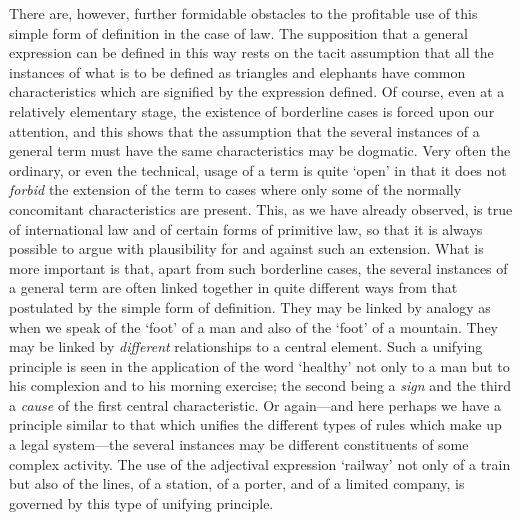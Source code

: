 \documentclass[12pt,oneside]{book}  %
\begin{document}
There are, however, further formidable obstacles to the profitable use
of this simple form of definition in the case of law. The supposition
that a general expression can be defined in this way rests on the tacit
assumption that all the instances of what is to be defined as triangles
and elephants have common characteristics which are signified by the
expression defined. Of course, even at a relatively elementary stage,
the existence of borderline cases is forced upon our attention, and this
shows that the assumption that the several instances of a general term
must have the same characteristics may be dogmatic. Very often the
ordinary, or even the technical, usage of a term is quite `open' in that
it does not \emph{forbid} the extension of the term to cases where only
some of the normally concomitant characteristics are present. This, as
we have already observed, is true of international law and of certain
forms of primitive law, so that it is always possible to argue with
plausibility for and against such an extension. What is more important
is that, apart from such borderline cases, the several instances of a
general term are often linked together in quite different ways from that
postulated by the simple form of definition. They may be linked by
analogy as when we speak of the `foot' of a man and also of the `foot'
of a mountain. They may be linked by \emph{different} relationships to a
central element. Such a unifying principle is seen in the application of
the word `healthy' not only to a man but to his complexion and to his
morning exercise; the second being a \emph{sign} and the third a
\emph{cause} of the first central characteristic. Or again---and here
perhaps we have a principle similar to that which unifies the different
types of rules which make up a legal system---the several instances may
be different constituents of some complex activity. The use of the
adjectival expression `railway' not only of a train but also of the
lines, of a station, of a porter, and of a limited company, is governed
by this type of unifying principle.
\end{document}
